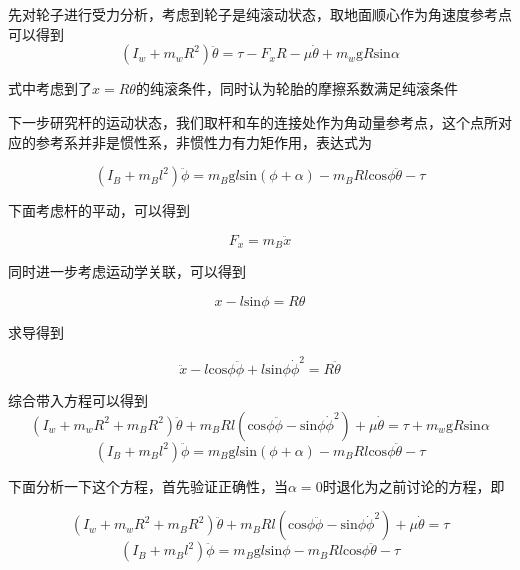 \documentclass[UTF8,a4paper]{paper}
\begin{document}
先对轮子进行受力分析，考虑到轮子是纯滚动状态，取地面顺心作为角速度参考点可以得到
\begin{equation}
(I_w+m_wR^2)\ddot{\theta}=\tau-F_xR-\mu\dot{\theta}+m_w\mathrm{g}R\mathrm{sin}\alpha
\end{equation}

式中考虑到了$x=R\theta$的纯滚条件，同时认为轮胎的摩擦系数满足纯滚条件

下一步研究杆的运动状态，我们取杆和车的连接处作为角动量参考点，这个点所对应的参考系并非是惯性系，非惯性力有力矩作用，表达式为

\begin{equation}
(I_B+m_Bl^2)\ddot{\phi}=m_B\mathrm{g}l\mathrm{sin}(\phi+\alpha)-m_BRl\mathrm{cos}\phi\ddot{\theta}-\tau
\end{equation}

下面考虑杆的平动，可以得到

\begin{equation}
F_x=m_B\ddot{x}
\end{equation}

同时进一步考虑运动学关联，可以得到

\begin{equation}
x-l\mathrm{sin}\phi=R\theta
\end{equation}

求导得到

\begin{equation}
\ddot{x}-l\mathrm{cos}\phi\ddot{\phi}+l\mathrm{sin}\phi\dot{\phi}^2=R\ddot{\theta}
\end{equation}

综合带入方程可以得到
\begin{equation}
(I_w+m_wR^2+m_BR^2)\ddot{\theta}+m_BRl(\mathrm{cos}\phi\ddot{\phi}-\mathrm{sin}\phi\dot{\phi}^2)+\mu\dot{\theta}=\tau+m_w\mathrm{g}R\mathrm{sin}\alpha
\end{equation}
\begin{equation}
(I_B+m_Bl^2)\ddot{\phi}=m_B\mathrm{g}l\mathrm{sin}(\phi+\alpha)-m_BRl\mathrm{cos}\phi\ddot{\theta}-\tau
\end{equation}

下面分析一下这个方程，首先验证正确性，当$\alpha=0$时退化为之前讨论的方程，即

\begin{equation}
(I_w+m_wR^2+m_BR^2)\ddot{\theta}+m_BRl(\mathrm{cos}\phi\ddot{\phi}-\mathrm{sin}\phi\dot{\phi}^2)+\mu\dot{\theta}=\tau
\end{equation}
\begin{equation}
(I_B+m_Bl^2)\ddot{\phi}=m_B\mathrm{g}l\mathrm{sin}\phi-m_BRl\mathrm{cos}\phi\ddot{\theta}-\tau
\end{equation}
\end{document}
